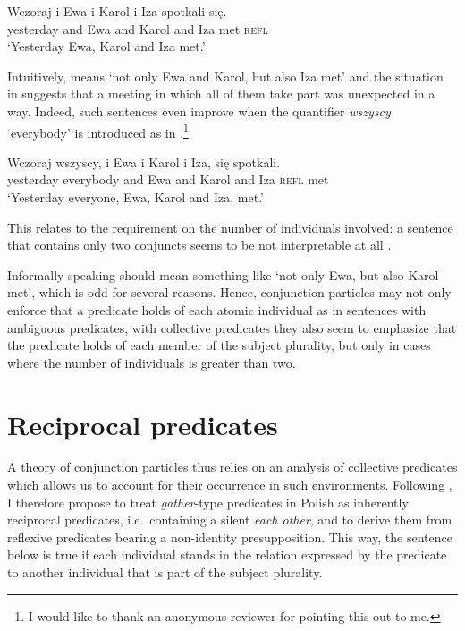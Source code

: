 \documentclass[output=paper]{langscibook}
\begin{document}
\ea\label{ros:context-ex1} \gll Wczoraj i Ewa i Karol i Iza spotkali się. \\
yesterday and Ewa and Karol and Iza  met \textsc{refl} \\
\glt `Yesterday Ewa, Karol and Iza met.' 
\z

\noindent Intuitively,  means `not only Ewa and Karol, but also Iza met' and the situation in  suggests that a meeting in which all of them take part was unexpected in a way. Indeed, such sentences even improve when the quantifier \textit{wszyscy} `everybody' is introduced as in .\footnote{I would like to thank an anonymous reviewer for pointing this out to me.}

\ea\label{ros:wsz} \gll Wczoraj wszyscy, i Ewa i Karol i Iza, się spotkali. \\
yesterday everybody and Ewa and Karol and Iza \textsc{refl}  met \\
\glt `Yesterday everyone, Ewa, Karol and Iza, met.' 
\z


\noindent This relates to the requirement on the number of individuals involved: a sentence that contains only two conjuncts seems to be not interpretable at all . 

\z

\noindent Informally speaking  should mean something like `not only Ewa, but also Karol met', which is odd for several reasons. Hence, conjunction particles may not only enforce that a predicate holds of each atomic individual as in sentences with ambiguous predicates, with collective predicates they also seem to emphasize that the predicate holds of each member of the subject plurality, but only in cases where the number of individuals is greater than two.


\section{Reciprocal predicates}\label{ros:sec:5}

A theory of conjunction particles thus relies on an analysis of collective predicates which allows us to account for their occurrence in such environments. Following \citet{Hackl:2002}, I therefore propose to treat \textit{gather}-type predicates in Polish as inherently reciprocal predicates, i.e.~containing a silent \textit{each other}, and to derive them from reflexive predicates bearing a non-identity presupposition. This way, the sentence below is true if each individual stands in the relation expressed by the predicate to another individual that is part of the subject plurality.
\end{document}
